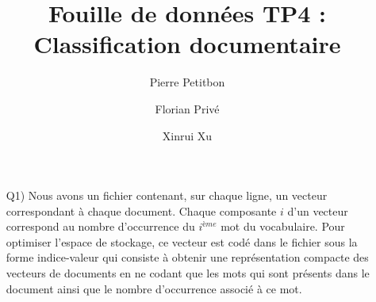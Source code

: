 \documentclass[a4paper, 12pt]{article}
\title{Fouille de données TP4 : Classification documentaire}
\author{Pierre Petitbon \and Florian Privé \and Xinrui Xu}
\date{}
\begin{document}
\maketitle

\begin{enumerate}
\setlength{\itemsep}{20pt}

\item[Q1)] 
Nous avons un fichier contenant, sur chaque ligne, un vecteur correspondant à chaque document. Chaque composante $i$ d'un vecteur correspond au nombre d'occurrence du $i^{ème}$ mot du vocabulaire. Pour optimiser l'espace de stockage, ce vecteur est codé dans le fichier sous la forme indice-valeur qui consiste à obtenir une représentation compacte des vecteurs de documents en ne codant que les mots qui sont présents dans le document ainsi que le nombre d'occurrence associé à ce mot. 


\end{enumerate}
\end{document}
